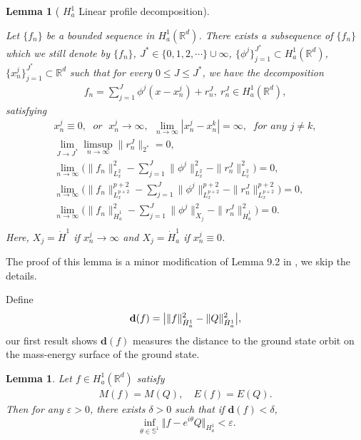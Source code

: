 \documentclass[12pt]{amsart}
\newcommand{\R}{\mathbb R}
\newcommand{\nha}{H^1_a}
\newcommand{\Rd}{\mathbb R^d}
\newcommand{\ha}{\dot H^1_a}
\newtheorem{lemma}[theorem]{Lemma}
\begin{document}
\begin{lemma}[ $\nha$ Linear profile decomposition]\label{lm:lp}

Let $\{f_n\}$ be a bounded sequence in $\nha(\mathbb R^d)$.  There exists  a subsequence of $\{f_n\}$ which we still denote by $\{f_n\}$, $J^*\in \{0, 1, 2,\cdots\}\cup{\infty}$, $\{\phi^j\}_{j=1}^{J^*}\subset \nha(\R^d)$, $\{x_n^j\}_{j=1}^{J^*}\subset \Rd$ such that for every $0\le J\le J^*$, we have the decomposition 
\begin{align*}
f_n=\sum_{j=1}^{J} \phi^j(x-x_n^j)+r_n^J, \ r_n^J\in \nha(\Rd), 
\end{align*}
satisfying 
\begin{gather*}
x_n^j\equiv0, \; \textit{ or } \; x_n^j\to \infty,\ \ \lim_{n\to \infty}|x_n^j-x_n^k|=\infty, \ \textit{ for any } j\neq k, \\
\lim_{J\to J^*}\limsup_{n\to \infty}\|r_n^J\|_{{2^*}}=0,\\
\lim_{n\to \infty}\bigl(\|f_n\|_{L_x^2}^2-\sum_{j=1}^J \|\phi^j\|_{L_x^2}^2-\|r_n^J\|_{L_x^2}^2\bigr)=0,\\
\lim_{n\to \infty}\bigl(\|f_n\|_{L_x^{p+2}}^{p+2}-\sum_{j=1}^J \|\phi^j\|_{L_x^{p+2}}^{p+2}-\|r_n^J\|_{L_x^{p+2}}^{p+2}\bigr)=0,\\
\lim_{n\to \infty}\bigl(\|f_n\|_{\ha}^2-\sum_{j=1}^J \|\phi^j\|_{X_j}^2-\|r_n^J\|_{\ha}^2\bigr)=0. \\
\end{gather*}
Here, $X_j=\dot H^1$ if $x_n^j\to \infty$ and $X_j=\ha$ if $x_n^j\equiv0$. 
\end{lemma}

The proof of this lemma is a minor modification of Lemma 9.2 in \cite{YZZ22}, we skip the details. 

Define
\begin{equation}\label{df}
\mathbf{d}(f)=\bigl |\Vert f\Vert _{\dot{H}_{a}^{1}}^{2}-\Vert Q\Vert _{\dot{%
H}_{a}^{1}}^{2}\bigr|,
\end{equation}%
our first result shows $\mathbf d(f)$ measures the distance to the ground state orbit on the mass-energy surface of the ground state. 

\begin{lemma}\label{lm: vc} Let $f\in H_{a}^{1}(\mathbb{R}^{d})$ satisfy 
\begin{align*}
 M(f)=M(Q), \quad E(f)=E(Q). 
 \end{align*}
  Then for any $\varepsilon >0$, there exists $\delta >0$ such
that if $\mathbf{d}(f)<\delta $, 
\begin{equation*}
\ \inf_{\theta \in \mathbb{S}^{1}}\Vert f-e^{i\theta }Q\Vert
_{H_{a}^{1}}<\varepsilon .
\end{equation*}
\end{lemma}
\end{document}
